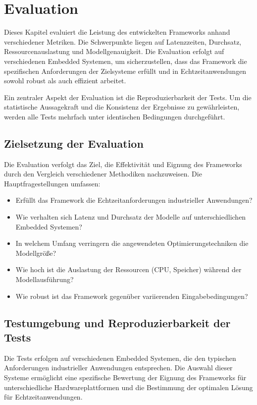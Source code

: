 \chapter{Evaluation}
\label{chap:evaluation}

Dieses Kapitel evaluiert die Leistung des entwickelten Frameworks anhand verschiedener Metriken. Die Schwerpunkte liegen auf Latenzzeiten, Durchsatz, Ressourcenauslastung und Modellgenauigkeit. Die Evaluation erfolgt auf verschiedenen Embedded Systemen, um sicherzustellen, dass das Framework die spezifischen Anforderungen der Zielsysteme erfüllt und in Echtzeitanwendungen sowohl robust als auch effizient arbeitet.

Ein zentraler Aspekt der Evaluation ist die Reproduzierbarkeit der Tests. Um die statistische Aussagekraft und die Konsistenz der Ergebnisse zu gewährleisten, werden alle Tests mehrfach unter identischen Bedingungen durchgeführt.

\section{Zielsetzung der Evaluation}

Die Evaluation verfolgt das Ziel, die Effektivität und Eignung des Frameworks durch den Vergleich verschiedener Methodiken nachzuweisen. Die Hauptfragestellungen umfassen:
\begin{itemize}
\item Erfüllt das Framework die Echtzeitanforderungen industrieller Anwendungen?
\item Wie verhalten sich Latenz und Durchsatz der Modelle auf unterschiedlichen Embedded Systemen?
\item In welchem Umfang verringern die angewendeten Optimierungstechniken die Modellgröße?
\item Wie hoch ist die Auslastung der Ressourcen (CPU, Speicher) während der Modellausführung?
\item Wie robust ist das Framework gegenüber variierenden Eingabebedingungen?
\end{itemize}

\section{Testumgebung und Reproduzierbarkeit der Tests}

Die Tests erfolgen auf verschiedenen Embedded Systemen, die den typischen Anforderungen industrieller Anwendungen entsprechen. Die Auswahl dieser Systeme ermöglicht eine spezifische Bewertung der Eignung des Frameworks für unterschiedliche Hardwareplattformen und die Bestimmung der optimalen Lösung für Echtzeitanwendungen.

